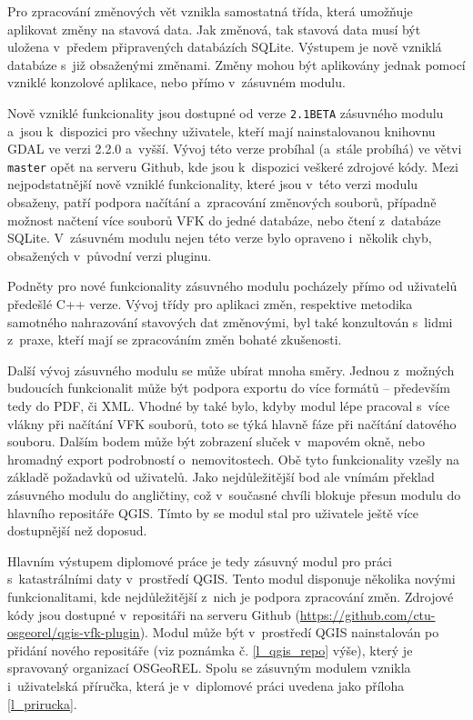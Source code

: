 \documentclass[a4paper,12pt,oneside]{book}
\begin{document}
Pro zpracování změnových vět vznikla samostatná třída, která umožňuje
aplikovat změny na stavová data. Jak změnová, tak stavová data musí být
uložena v~předem připravených databázích SQLite. Výstupem je nově vzniklá
databáze s~již obsaženými změnami. Změny mohou být aplikovány jednak pomocí
vzniklé konzolové aplikace, nebo přímo v~zásuvném modulu.

Nově vzniklé funkcionality jsou dostupné od verze \texttt{2.1BETA}
zásuvného modulu a~jsou k~dispozici pro všechny uživatele, kteří mají
nainstalovanou knihovnu GDAL ve verzi 2.2.0 a~vyšší. Vývoj této verze
probíhal (a~stále probíhá) ve větvi \texttt{master} opět na serveru
Github, kde jsou k~dispozici veškeré zdrojové kódy. Mezi
nejpodstatnější nově vzniklé funkcionality, které jsou v~této verzi
modulu obsaženy, patří podpora načítání a~zpracování změnových
souborů, případně možnost načtení více souborů VFK do jedné databáze,
nebo čtení z~databáze SQLite. V~zásuvném modulu nejen této verze
bylo opraveno i~několik chyb, obsažených v~původní verzi pluginu.

Podněty pro nové funkcionality zásuvného modulu pocházely přímo od
uživatelů předešlé C++ verze. Vývoj třídy pro aplikaci změn,
respektive metodika samotného nahrazování stavových dat změnovými, byl
také konzultován s~lidmi z~praxe, kteří mají se zpracováním změn
bohaté zkušenosti.

Další vývoj zásuvného modulu se může ubírat mnoha směry. Jednou
z~možných budoucích funkcionalit může být podpora exportu do více
formátů -- především tedy do PDF, či XML. Vhodné by také bylo, kdyby
modul lépe pracoval s~více vlákny při načítání VFK souborů, toto se
týká hlavně fáze při načítání datového souboru. Dalším bodem může být
zobrazení sluček v~mapovém okně, nebo hromadný export podrobností
o~nemovitostech. Obě tyto funkcionality vzešly na základě požadavků od
uživatelů. Jako nejdůležitější bod ale vnímám překlad zásuvného modulu
do angličtiny, což v~současné chvíli blokuje přesun modulu do hlavního
repositáře QGIS. Tímto by se modul stal pro uživatele ještě více
dostupnější než doposud.

Hlavním výstupem diplomové práce je tedy zásuvný modul pro práci
s~katastrálními daty v~prostředí QGIS. Tento modul disponuje několika
novými funkcionalitami, kde nejdůležitější z~nich je podpora
zpracování změn. Zdrojové kódy jsou dostupné v~repositáři na serveru
Github (\url{https://github.com/ctu-osgeorel/qgis-vfk-plugin}). Modul
může být v~prostředí QGIS nainstalován po přidání nového repositáře
(viz poznámka č. \ref{l_qgis_repo} výše), který je
spravovaný organizací OSGeoREL. Spolu se zásuvným modulem vznikla
i~uživatelská příručka, která je v~diplomové práci uvedena jako
příloha \ref{l_prirucka}.
\end{document}

